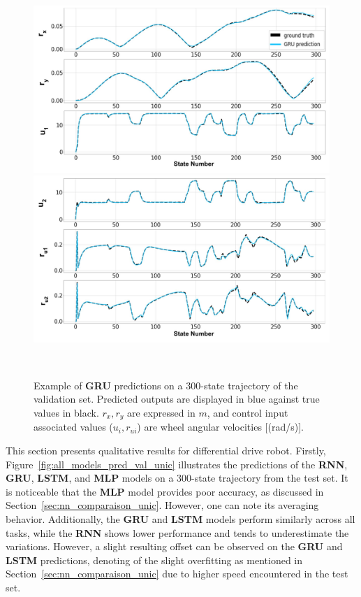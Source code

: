 \begin{figure}[t]
    \centering
    \begin{minipage}{0.49\linewidth}
        \centering
        \includegraphics[width=\linewidth]{figures/learning_unic/pred_val_1_labeled.jpg}
    \end{minipage}
    \begin{minipage}{0.49\linewidth}
        \centering
        \includegraphics[width=\linewidth]{figures/learning_unic/pred_val_2_labeled.jpg}
    \end{minipage}\\
    \caption{Example of \textbf{GRU} predictions on a 300-state trajectory of the validation set. 
    Predicted outputs are displayed in blue against true values in black. $r_{x}, r_{y}$ are expressed in $m$, and control input associated values ($u_{i},r_{ui}$) are wheel angular velocities [(rad/s)].}
    \label{fig:pred_val_unic}
\end{figure}

This section presents qualitative results for differential drive robot.
Firstly, Figure~\ref{fig:all_models_pred_val_unic} illustrates the predictions of the \textbf{RNN}, \textbf{GRU}, \textbf{LSTM}, and \textbf{MLP} models on a 300-state trajectory from the test set.
It is noticeable that the \textbf{MLP} model provides poor accuracy, as discussed in Section~\ref{sec:nn_comparaison_unic}.
However, one can note its averaging behavior.
Additionally, the \textbf{GRU} and \textbf{LSTM} models perform similarly across all tasks, while the \textbf{RNN} shows lower performance and tends to underestimate the variations.
However, a slight resulting offset can be observed on the \textbf{GRU} and \textbf{LSTM} predictions, denoting of the slight overfitting as mentioned in Section~\ref{sec:nn_comparaison_unic} due to higher speed encountered in the test set.

